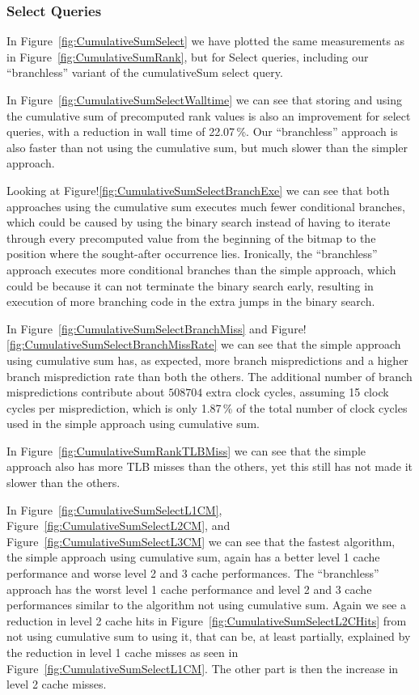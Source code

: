 \subsubsection{Select Queries}
\label{sec:cumulativeSumExperimentSelectQueries}
In Figure~\ref{fig:CumulativeSumSelect} we have plotted the same measurements as in Figure~\ref{fig:CumulativeSumRank}, but for Select queries, including our “branchless” variant of the cumulativeSum select query.

In Figure~\ref{fig:CumulativeSumSelectWalltime} we can see that storing and using the cumulative sum of precomputed rank values is also an improvement for select queries, with a reduction in wall time of 22.07\,\%.
Our “branchless” approach is also faster than not using the cumulative sum, but much slower than the simpler approach.

Looking at Figure!\ref{fig:CumulativeSumSelectBranchExe} we can see that both approaches using the cumulative sum executes much fewer conditional branches, which could be caused by using the binary search instead of having to iterate through every precomputed value from the beginning of the bitmap to the position where the sought-after occurrence lies.
Ironically, the “branchless” approach executes more conditional branches than the simple approach, which could be because it can not terminate the binary search early, resulting in execution of more branching code in the extra jumps in the binary search.

In Figure~\ref{fig:CumulativeSumSelectBranchMiss} and Figure!\ref{fig:CumulativeSumSelectBranchMissRate} we can see that the simple approach using cumulative sum has, as expected, more branch mispredictions and a higher branch misprediction rate than both the others.
The additional number of branch mispredictions contribute about $\num{508704}$ extra clock cycles, assuming 15 clock cycles per misprediction, which is only 1.87\,\% of the total number of clock cycles used in the simple approach using cumulative sum.

In Figure~\ref{fig:CumulativeSumRankTLBMiss} we can see that the simple approach also has more TLB misses than the others, yet this still has not made it slower than the others.

In Figure~\ref{fig:CumulativeSumSelectL1CM}, Figure~\ref{fig:CumulativeSumSelectL2CM}, and Figure~\ref{fig:CumulativeSumSelectL3CM} we can see that the fastest algorithm, the simple approach using cumulative sum, again has a better level 1 cache performance and worse level 2 and 3 cache performances.
The “branchless” approach has the worst level 1 cache performance and level 2 and 3 cache performances similar to the algorithm not using cumulative sum.
Again we see a reduction in level 2 cache hits in Figure~\ref{fig:CumulativeSumSelectL2CHits} from not using cumulative sum to using it, that can be, at least partially, explained by the reduction in level 1 cache misses as seen in Figure~\ref{fig:CumulativeSumSelectL1CM}.
The other part is then the increase in level 2 cache misses.


